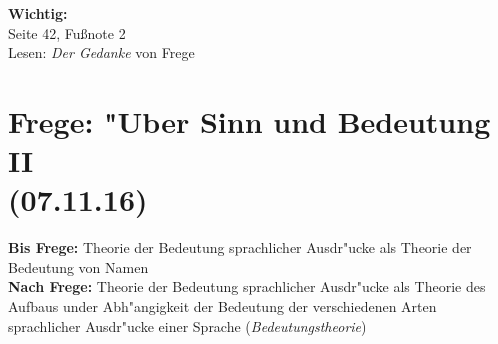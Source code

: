 \documentclass[emulatestandardclasses]{scrartcl}
\begin{document}
\textbf{Wichtig:}\\Seite 42, Fu\ss note 2\\
Lesen: \emph{Der Gedanke }von Frege


\section{Frege: "Uber Sinn und Bedeutung II\\(07.11.16)}


\textbf{Bis Frege:} Theorie der Bedeutung sprachlicher Ausdr"ucke als Theorie der Bedeutung von Namen\\
\textbf{Nach Frege:} Theorie der Bedeutung sprachlicher Ausdr"ucke als Theorie des Aufbaus under Abh"angigkeit der Bedeutung der verschiedenen Arten sprachlicher Ausdr"ucke einer Sprache (\emph{Bedeutungstheorie})
\end{document}
